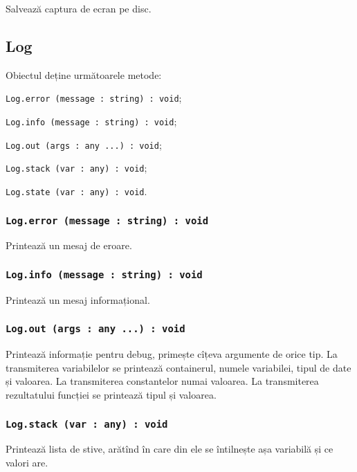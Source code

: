 Salvează captura de ecran pe disc.

\subsection{Log}

Obiectul \logtype{} deține următoarele metode:
\begin{icItems}
	\item \texttt{Log.error (message : string) : void};
	\item \texttt{Log.info (message : string) : void};
	\item \texttt{Log.out (args : any ...) : void};
	\item \texttt{Log.stack (var : any) : void};
	\item \texttt{Log.state (var : any) : void}.
\end{icItems}

\subsubsection{\texttt{Log.error (message : string) : void}}

Printează un mesaj de eroare.

\subsubsection{\texttt{Log.info (message : string) : void}}

Printează un mesaj informațional.

\subsubsection{\texttt{Log.out (args : any ...) : void}}

Printează informație pentru debug, primește cîțeva argumente de orice tip. La transmiterea variabilelor se printează containerul, numele variabilei, tipul de date și valoarea. La transmiterea constantelor numai valoarea. La transmiterea rezultatului funcției se printează tipul și valoarea.

\subsubsection{\texttt{Log.stack (var : any) : void}}

Printează lista de stive, arătînd în care din ele se întilnește așa variabilă și ce valori are.


